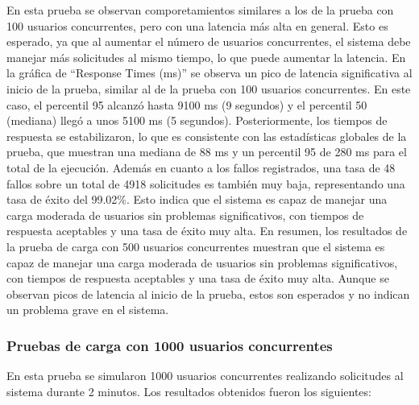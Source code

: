 En esta prueba se observan comporetamientos similares a los de la prueba con 100 usuarios concurrentes, pero con una latencia más alta en general. Esto es esperado, ya que al aumentar el número de usuarios concurrentes, el sistema debe manejar más solicitudes al mismo tiempo, lo que puede aumentar la latencia.
\newline\newline
En la gráfica de ``Response Times (ms)'' se observa un pico de latencia significativa al inicio de la prueba, similar al de la prueba con 100 usuarios concurrentes. En este caso, el percentil 95 alcanzó hasta 9100 ms (9 segundos) y el percentil 50 (mediana) llegó a unos 5100 ms (5 segundos). Posteriormente, los tiempos de respuesta se estabilizaron, lo que es consistente con las estadísticas globales de la prueba, que muestran una mediana de 88 ms y un percentil 95 de 280 ms para el total de la ejecución.
\newline\newline
Además en cuanto a los fallos registrados, una tasa de 48 fallos sobre un total de 4918 solicitudes es también muy baja, representando una tasa de éxito del 99.02\%. Esto indica que el sistema es capaz de manejar una carga moderada de usuarios sin problemas significativos, con tiempos de respuesta aceptables y una tasa de éxito muy alta.
\newline\newline
En resumen, los resultados de la prueba de carga con 500 usuarios concurrentes muestran que el sistema es capaz de manejar una carga moderada de usuarios sin problemas significativos, con tiempos de respuesta aceptables y una tasa de éxito muy alta. Aunque se observan picos de latencia al inicio de la prueba, estos son esperados y no indican un problema grave en el sistema.

\subsubsection{Pruebas de carga con 1000 usuarios concurrentes}

En esta prueba se simularon 1000 usuarios concurrentes realizando solicitudes al sistema durante 2 minutos. Los resultados obtenidos fueron los siguientes:

\begin{table}[H]
\centering
{}
\caption{Resultados de la prueba de carga con 1000 usuarios concurrentes.}
\label{tab:locust1000}
\end{table}

